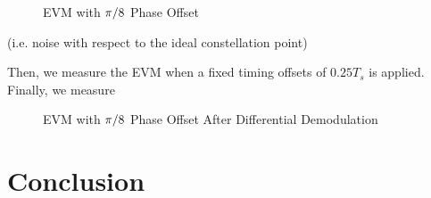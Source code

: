 \documentclass{article}
\begin{document}
\begin{figure}[H]
	\centerline{}
	\caption{EVM with $\protect\pi/8$ Phase Offset}
	\label{fig::evm_pi_8_phase_offset}
\end{figure}

(i.e. noise with respect to the ideal constellation point) 

Then, we measure the EVM when a fixed timing offsets of $0.25T_s$ is applied. Finally, we measure 


\begin{figure}[H]
	\centerline{}
	\caption{EVM with $\protect\pi/8$ Phase Offset After Differential Demodulation}
	\label{fig::evm_dpsk_modulation}
\end{figure}

\section{Conclusion}
	
\end{document}

